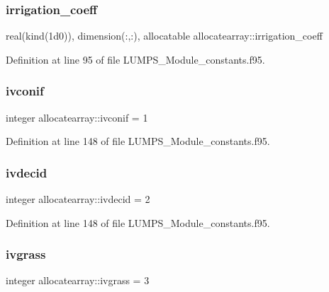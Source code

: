 \subsubsection{\texorpdfstring{irrigation\+\_\+coeff}{irrigation\_coeff}}
{\footnotesize\ttfamily real(kind(1d0)), dimension(\+:,\+:), allocatable allocatearray\+::irrigation\+\_\+coeff}



Definition at line 95 of file L\+U\+M\+P\+S\+\_\+\+Module\+\_\+constants.\+f95.

\mbox{\label{namespaceallocatearray_a808db51d4a8ed78af7b4ea759da827a2}} 
\subsubsection{\texorpdfstring{ivconif}{ivconif}}
{\footnotesize\ttfamily integer allocatearray\+::ivconif = 1}



Definition at line 148 of file L\+U\+M\+P\+S\+\_\+\+Module\+\_\+constants.\+f95.

\mbox{\label{namespaceallocatearray_a2cb5a7a20d0709bae84bb2339bb5d38f}} 
\subsubsection{\texorpdfstring{ivdecid}{ivdecid}}
{\footnotesize\ttfamily integer allocatearray\+::ivdecid = 2}



Definition at line 148 of file L\+U\+M\+P\+S\+\_\+\+Module\+\_\+constants.\+f95.

\mbox{\label{namespaceallocatearray_a4f4900cf0725d3239c9973fc7c48e5ba}} 
\subsubsection{\texorpdfstring{ivgrass}{ivgrass}}
{\footnotesize\ttfamily integer allocatearray\+::ivgrass = 3}



